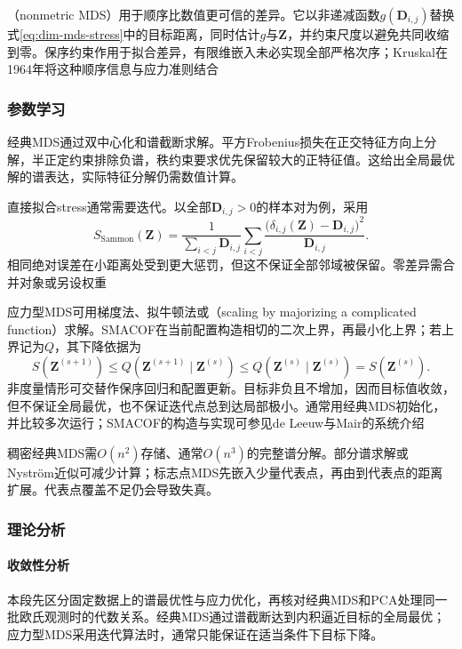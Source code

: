 （nonmetric MDS）用于顺序比数值更可信的差异。它以非递减函数$g(\bm{D}_{i,j})$替换式\eqref{eq:dim-mds-stress}中的目标距离，同时估计$g$与$\bm{Z}$，并约束尺度以避免共同收缩到零。保序约束作用于拟合差异，有限维嵌入未必实现全部严格次序；Kruskal在1964年将这种顺序信息与应力准则结合

\subsubsection{参数学习}

经典MDS通过双中心化和谱截断求解。平方Frobenius损失在正交特征方向上分解，半正定约束排除负谱，秩约束要求优先保留较大的正特征值。这给出全局最优解的谱表达，实际特征分解仍需数值计算。

直接拟合stress通常需要迭代。以全部$\bm{D}_{i,j}>0$的样本对为例，采用
\begin{equation}
  \label{eq:dim-sammon}
  S_{\mathrm{Sammon}}(\bm{Z})
  =\frac{1}{\sum_{i<j}\bm{D}_{i,j}}
    \sum_{i<j}
    \frac{\bigl(\delta_{i,j}(\bm{Z})-\bm{D}_{i,j}\bigr)^2}
         {\bm{D}_{i,j}}.
\end{equation}
相同绝对误差在小距离处受到更大惩罚，但这不保证全部邻域被保留。零差异需合并对象或另设权重

应力型MDS可用梯度法、拟牛顿法或（scaling by majorizing a complicated function）求解。SMACOF在当前配置构造相切的二次上界，再最小化上界；若上界记为$Q$，其下降依据为
\[
  S(\bm{Z}^{(s+1)})
  \leq Q(\bm{Z}^{(s+1)}\mid\bm{Z}^{(s)})
  \leq Q(\bm{Z}^{(s)}\mid\bm{Z}^{(s)})
  =S(\bm{Z}^{(s)}).
\]
非度量情形可交替作保序回归和配置更新。目标非负且不增加，因而目标值收敛，但不保证全局最优，也不保证迭代点总到达局部极小。通常用经典MDS初始化，并比较多次运行；SMACOF的构造与实现可参见de Leeuw与Mair的系统介绍

稠密经典MDS需$O(n^2)$存储、通常$O(n^3)$的完整谱分解。部分谱求解或Nystr\"om近似可减少计算；标志点MDS先嵌入少量代表点，再由到代表点的距离扩展。代表点覆盖不足仍会导致失真。

\subsubsection{理论分析}
\label{sec:dim-mds-theory}

\paragraph{收敛性分析}

本段先区分固定数据上的谱最优性与应力优化，再核对经典MDS和PCA处理同一批欧氏观测时的代数关系。经典MDS通过谱截断达到内积逼近目标的全局最优；应力型MDS采用迭代算法时，通常只能保证在适当条件下目标下降。

